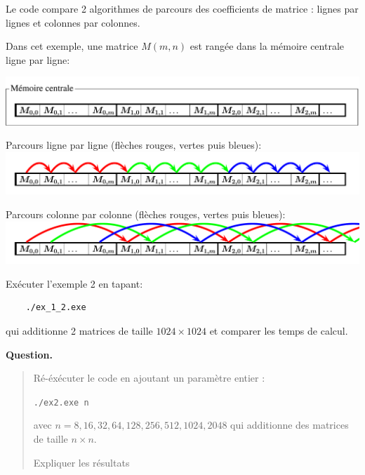 \documentclass{beamer}
\begin{document}
\begin{frame}
	Le code compare 2 algorithmes de parcours des coefficients de matrice : lignes par lignes et colonnes par colonnes.
	\vfill
	
	Dans cet exemple, une matrice $M(m,n)$ est rangée dans la mémoire centrale ligne par ligne:
	
	\includegraphics[scale=0.4]{../../Images/ex2_memoire}
	
	Parcours ligne par ligne (flèches rouges, vertes puis bleues):
	\includegraphics[scale=0.4]{../../Images/ex2_memoire_1}
	
	Parcours colonne par colonne (flèches rouges, vertes puis bleues):
	\includegraphics[scale=0.4]{../../Images/ex2_memoire_2}
\end{frame}

\begin{frame}[fragile]
	Exécuter l'exemple 2 en tapant:
	\begin{verbatim}
	./ex_1_2.exe
	\end{verbatim}
	qui additionne 2 matrices de taille $1024 \times 1024$
	et comparer les temps de calcul.
	\vfill
	
	{\bf Question.}
	\begin{quote}
		Ré-éxécuter le code en ajoutant un paramètre entier :

			\quad\verb|./ex2.exe n|

		avec $n = 8, 16, 32, 64, 128, 256, 512, 1024, 2048$
		qui additionne des matrices de taille $n\times n$.
		\bigskip
		
		Expliquer les résultats		
	\end{quote}
	
\end{frame}
\end{document}
